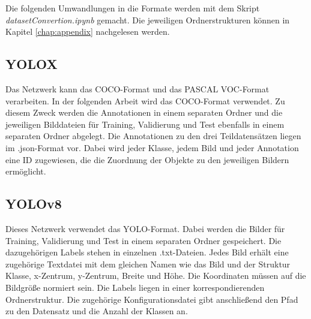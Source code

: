 Die folgenden Umwandlungen in die Formate werden mit dem Skript \textit{datasetConvertion.ipynb} gemacht. Die jeweiligen Ordnerstrukturen können in Kapitel \ref{chap:appendix} nachgelesen werden.


\subsection{YOLOX}
Das Netzwerk kann das COCO-Format und das PASCAL VOC-Format verarbeiten. In der folgenden Arbeit wird das COCO-Format verwendet. Zu diesem Zweck werden die Annotationen in einem separaten Ordner und die jeweiligen Bilddateien für Training, Validierung und Test ebenfalls in einem separaten Ordner abgelegt. Die Annotationen zu den drei Teildatensätzen liegen im .json-Format vor. Dabei wird jeder Klasse, jedem Bild und jeder Annotation eine ID zugewiesen, die die Zuordnung der Objekte zu den jeweiligen Bildern ermöglicht. 



\subsection{YOLOv8}
Dieses Netzwerk verwendet das YOLO-Format. Dabei werden die Bilder für Training, Validierung und Test in einem separaten Ordner gespeichert. Die dazugehörigen Labels stehen in einzelnen .txt-Dateien. Jedes Bild erhält eine zugehörige Textdatei mit dem gleichen Namen wie das Bild und der Struktur Klasse, x-Zentrum, y-Zentrum, Breite und Höhe. Die Koordinaten müssen auf die Bildgröße normiert sein. Die Labels liegen in einer korrespondierenden Ordnerstruktur. Die zugehörige Konfigurationsdatei gibt anschließend den Pfad zu den Datensatz und die Anzahl der Klassen an. 



